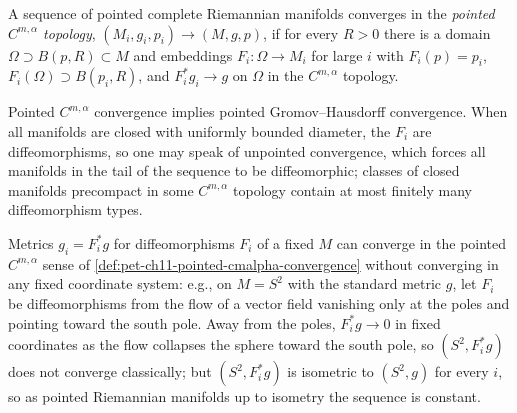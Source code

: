 \begin{definition}
  \label{def:pet-ch11-pointed-cmalpha-convergence}
  A sequence of pointed complete Riemannian manifolds converges in the
  \emph{pointed $C^{m,\alpha}$ topology}, $(M_i,g_i,p_i)\to(M,g,p)$, if for
  every $R>0$ there is a domain $\Omega\supset B(p,R)\subset M$ and
  embeddings $F_i:\Omega\to M_i$ for large $i$ with $F_i(p)=p_i$,
  $F_i(\Omega)\supset B(p_i,R)$, and $F_i^*g_i\to g$ on $\Omega$ in the
  $C^{m,\alpha}$ topology.
\end{definition}

\begin{remark}
  \label{rem:pet-ch11-cmalpha-convergence-implies-gh}
  Pointed $C^{m,\alpha}$ convergence implies pointed Gromov--Hausdorff
  convergence. When all manifolds are closed with uniformly bounded
  diameter, the $F_i$ are diffeomorphisms, so one may speak of unpointed
  convergence, which forces all manifolds in the tail of the sequence to be
  diffeomorphic; classes of closed manifolds precompact in some $C^{m,\alpha}$
  topology contain at most finitely many diffeomorphism types.
\end{remark}

\begin{remark}
  \label{rem:pet-ch11-cmalpha-convergence-pullback-warning}
  Metrics $g_i=F_i^*g$ for diffeomorphisms $F_i$ of a fixed $M$ can converge
  in the pointed $C^{m,\alpha}$ sense of
  \cref{def:pet-ch11-pointed-cmalpha-convergence} without converging in any
  fixed coordinate system: e.g., on $M=S^2$ with the standard metric $g$, let
  $F_i$ be diffeomorphisms from the flow of a vector field vanishing only at
  the poles and pointing toward the south pole. Away from the poles,
  $F_i^*g\to0$ in fixed coordinates as the flow collapses the sphere toward
  the south pole, so $(S^2,F_i^*g)$ does not converge classically; but
  $(S^2,F_i^*g)$ is isometric to $(S^2,g)$ for every $i$, so as pointed
  Riemannian manifolds up to isometry the sequence is constant.
\end{remark}

